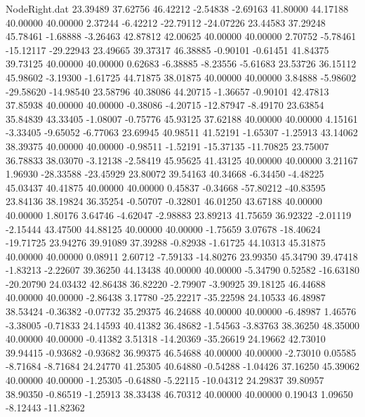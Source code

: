 \begin{filecontents}{NodeRight.dat}
  23.39489   37.62756   46.42212    -2.54838   -2.69163   41.80000   44.17188   40.00000   40.00000    2.37244   -6.42212  -22.79112  -24.07226
  23.44583   37.29248   45.78461    -1.68888   -3.26463   42.87812   42.00625   40.00000   40.00000    2.70752   -5.78461  -15.12117  -29.22943
  23.49665   39.37317   46.38885    -0.90101   -0.61451   41.84375   39.73125   40.00000   40.00000    0.62683   -6.38885   -8.23556   -5.61683
  23.53726   36.15112   45.98602    -3.19300   -1.61725   44.71875   38.01875   40.00000   40.00000    3.84888   -5.98602  -29.58620  -14.98540
  23.58796   40.38086   44.20715    -1.36657   -0.90101   42.47813   37.85938   40.00000   40.00000   -0.38086   -4.20715  -12.87947   -8.49170
  23.63854   35.84839   43.33405    -1.08007   -0.75776   45.93125   37.62188   40.00000   40.00000    4.15161   -3.33405   -9.65052   -6.77063
  23.69945   40.98511   41.52191    -1.65307   -1.25913   43.14062   38.39375   40.00000   40.00000   -0.98511   -1.52191  -15.37135  -11.70825
  23.75007   36.78833   38.03070    -3.12138   -2.58419   45.95625   41.43125   40.00000   40.00000    3.21167    1.96930  -28.33588  -23.45929
  23.80072   39.54163   40.34668    -6.34450   -4.48225   45.03437   40.41875   40.00000   40.00000    0.45837   -0.34668  -57.80212  -40.83595
  23.84136   38.19824   36.35254    -0.50707   -0.32801   46.01250   43.67188   40.00000   40.00000    1.80176    3.64746   -4.62047   -2.98883
  23.89213   41.75659   36.92322    -2.01119   -2.15444   43.47500   44.88125   40.00000   40.00000   -1.75659    3.07678  -18.40624  -19.71725
  23.94276   39.91089   37.39288    -0.82938   -1.61725   44.10313   45.31875   40.00000   40.00000    0.08911    2.60712   -7.59133  -14.80276
  23.99350   45.34790   39.47418    -1.83213   -2.22607   39.36250   44.13438   40.00000   40.00000   -5.34790    0.52582  -16.63180  -20.20790
  24.03432   42.86438   36.82220    -2.79907   -3.90925   39.18125   46.44688   40.00000   40.00000   -2.86438    3.17780  -25.22217  -35.22598
  24.10533   46.48987   38.53424    -0.36382   -0.07732   35.29375   46.24688   40.00000   40.00000   -6.48987    1.46576   -3.38005   -0.71833
  24.14593   40.41382   36.48682    -1.54563   -3.83763   38.36250   48.35000   40.00000   40.00000   -0.41382    3.51318  -14.20369  -35.26619
  24.19662   42.73010   39.94415    -0.93682   -0.93682   36.99375   46.54688   40.00000   40.00000   -2.73010    0.05585   -8.71684   -8.71684
  24.24770   41.25305   40.64880    -0.54288   -1.04426   37.16250   45.39062   40.00000   40.00000   -1.25305   -0.64880   -5.22115  -10.04312
  24.29837   39.80957   38.90350    -0.86519   -1.25913   38.33438   46.70312   40.00000   40.00000    0.19043    1.09650   -8.12443  -11.82362

\end{filecontents}
